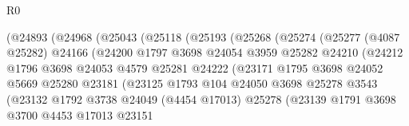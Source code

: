 \begin{lexlean}{R0}
\begin{coremodule}
                        (@24893
                          (@24968
                            (@25043
                              (@25118
                                (@25193
                                  (@25268
                                    (@25274
                                      (@25277
                                        (@4087 @25282)
                                        @24166
                                        (@24200
                                          @1797
                                          @3698
                                          @24054
                                          @3959
                                          @25282
                                          @24210
                                          (@24212
                                            @1796
                                            @3698
                                            @24053
                                            @4579
                                            @25281
                                            @24222
                                            (@23171
                                              @1795
                                              @3698
                                              @24052
                                              @5669
                                              @25280
                                              @23181
                                              (@23125
                                                @1793
                                                @104
                                                @24050
                                                @3698
                                                @25278
                                                @3543
                                                (@23132
                                                  @1792
                                                  @3738
                                                  @24049
                                                  (@4454 @17013)
                                                  @25278
                                                  (@23139
                                                    @1791
                                                    @3698
                                                    @3700
                                                    @4453
                                                    @17013
                                                    @23151

\end{coremodule}
\end{lexlean}
